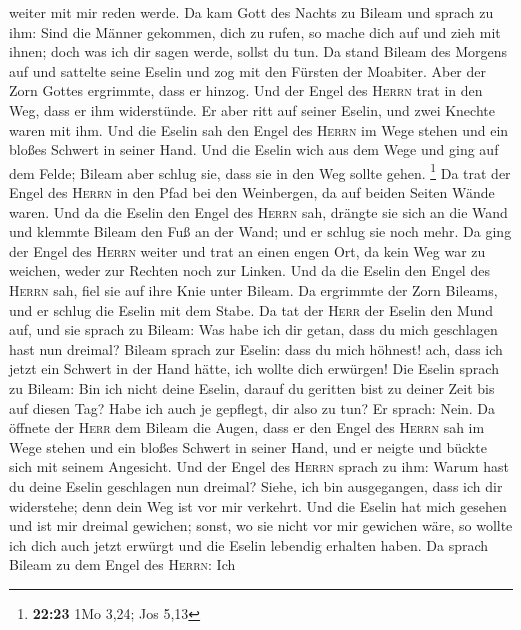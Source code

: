 weiter mit mir reden werde.  Da kam Gott des Nachts zu
Bileam und sprach zu ihm: Sind die Männer gekommen, dich zu rufen, so
mache dich auf und zieh mit ihnen; doch was ich dir sagen werde, sollst
du tun.  Da stand Bileam des Morgens auf und sattelte
seine Eselin und zog mit den Fürsten der Moabiter.  Aber
der Zorn Gottes ergrimmte, dass er hinzog. Und der Engel des
\textsc{Herrn} trat in den Weg, dass er ihm widerstünde. Er aber ritt
auf seiner Eselin, und zwei Knechte waren mit ihm.  Und
die Eselin sah den Engel des \textsc{Herrn} im Wege stehen und ein
bloßes Schwert in seiner Hand. Und die Eselin wich aus dem Wege und ging
auf dem Felde; Bileam aber schlug sie, dass sie in den Weg sollte gehen.
\footnote{\textbf{22:23} 1Mo 3,24; Jos 5,13}  Da trat der
Engel des \textsc{Herrn} in den Pfad bei den Weinbergen, da auf beiden
Seiten Wände waren.  Und da die Eselin den Engel des
\textsc{Herrn} sah, drängte sie sich an die Wand und klemmte Bileam den
Fuß an der Wand; und er schlug sie noch mehr.  Da ging
der Engel des \textsc{Herrn} weiter und trat an einen engen Ort, da kein
Weg war zu weichen, weder zur Rechten noch zur Linken. 
Und da die Eselin den Engel des \textsc{Herrn} sah, fiel sie auf ihre
Knie unter Bileam. Da ergrimmte der Zorn Bileams, und er schlug die
Eselin mit dem Stabe.  Da tat der \textsc{Herr} der
Eselin den Mund auf, und sie sprach zu Bileam: Was habe ich dir getan,
dass du mich geschlagen hast nun dreimal?  Bileam sprach
zur Eselin: dass du mich höhnest! ach, dass ich jetzt ein Schwert in der
Hand hätte, ich wollte dich erwürgen!  Die Eselin sprach
zu Bileam: Bin ich nicht deine Eselin, darauf du geritten bist zu deiner
Zeit bis auf diesen Tag? Habe ich auch je gepflegt, dir also zu tun? Er
sprach: Nein.  Da öffnete der \textsc{Herr} dem Bileam
die Augen, dass er den Engel des \textsc{Herrn} sah im Wege stehen und
ein bloßes Schwert in seiner Hand, und er neigte und bückte sich mit
seinem Angesicht.  Und der Engel des \textsc{Herrn}
sprach zu ihm: Warum hast du deine Eselin geschlagen nun dreimal? Siehe,
ich bin ausgegangen, dass ich dir widerstehe; denn dein Weg ist vor mir
verkehrt.  Und die Eselin hat mich gesehen und ist mir
dreimal gewichen; sonst, wo sie nicht vor mir gewichen wäre, so wollte
ich dich auch jetzt erwürgt und die Eselin lebendig erhalten haben.
 Da sprach Bileam zu dem Engel des \textsc{Herrn}: Ich
